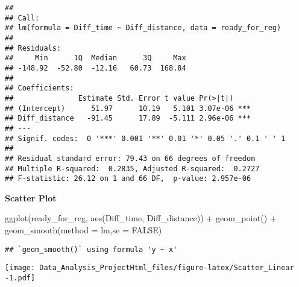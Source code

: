 \documentclass[
]{article}
\newenvironment{Shaded}{\begin{snugshade}}{\end{snugshade}}
\newcommand{\AttributeTok}[1]{\textcolor[rgb]{0.77,0.63,0.00}{#1}}
\newcommand{\ConstantTok}[1]{\textcolor[rgb]{0.00,0.00,0.00}{#1}}
\newcommand{\FunctionTok}[1]{\textcolor[rgb]{0.00,0.00,0.00}{#1}}
\newcommand{\NormalTok}[1]{#1}
\newcommand{\SpecialCharTok}[1]{\textcolor[rgb]{0.00,0.00,0.00}{#1}}
\begin{document}
\begin{verbatim}
## 
## Call:
## lm(formula = Diff_time ~ Diff_distance, data = ready_for_reg)
## 
## Residuals:
##     Min      1Q  Median      3Q     Max 
## -148.92  -52.80  -12.16   60.73  168.84 
## 
## Coefficients:
##               Estimate Std. Error t value Pr(>|t|)    
## (Intercept)      51.97      10.19   5.101 3.07e-06 ***
## Diff_distance   -91.45      17.89  -5.111 2.96e-06 ***
## ---
## Signif. codes:  0 '***' 0.001 '**' 0.01 '*' 0.05 '.' 0.1 ' ' 1
## 
## Residual standard error: 79.43 on 66 degrees of freedom
## Multiple R-squared:  0.2835, Adjusted R-squared:  0.2727 
## F-statistic: 26.12 on 1 and 66 DF,  p-value: 2.957e-06
\end{verbatim}

\textbf{Scatter Plot}

\begin{Shaded}
\begin{Highlighting}[]
\FunctionTok{ggplot}\NormalTok{(ready\_for\_reg, }\FunctionTok{aes}\NormalTok{(Diff\_time, Diff\_distance)) }\SpecialCharTok{+}
\FunctionTok{geom\_point}\NormalTok{() }\SpecialCharTok{+}
\FunctionTok{geom\_smooth}\NormalTok{(}\AttributeTok{method =}\NormalTok{ lm,}\AttributeTok{se =} \ConstantTok{FALSE}\NormalTok{)}
\end{Highlighting}
\end{Shaded}

\begin{verbatim}
## `geom_smooth()` using formula 'y ~ x'
\end{verbatim}

\texttt{[image: Data\_Analysis\_ProjectHtml\_files/figure-latex/Scatter\_Linear -1.pdf]}
\end{document}
